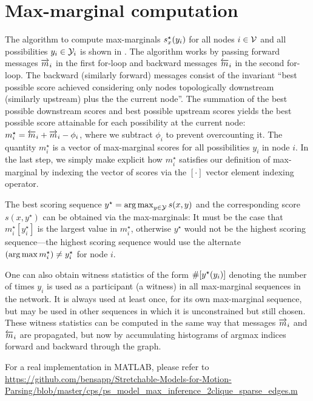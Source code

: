 \chapter{Max-marginal computation}\label{sec:mm-inference}

The algorithm to compute max-marginals $s^\star_x(y_i)$ for all nodes $i \in \mathcal{V}$ and all 
possibilities $y_i \in \mathcal{Y}_i$ is shown in .  The algorithm 
works by passing forward messages $\overrightarrow{m}_i$ in the first for-loop and 
backward messages $\overleftarrow{m}_i$ in the second for-loop.  The backward (similarly 
forward) messages consist of the invariant ``best possible score achieved 
considering only nodes topologically downstream (similarly upstream) plus the
the current node''.  The summation of the best possible downstream scores and 
best possible upstream scores yields the best possible score attainable for 
each possibility at the current node: $m^\star_i = \overleftarrow{m}_i + \overrightarrow{m}_i - 
\phi_i$, where we subtract $\phi_i$ to prevent overcounting it.  The quantity 
$m^\star_i$ is a vector of max-marginal scores for all possibilities $y_i$ in 
node $i$.  In the last step, we simply make explicit how $m^\star_i$ satisfies 
our definition of max-marginal by indexing the vector of scores via the 
$[\cdot]$ vector element indexing operator.

The best scoring sequence $y^\star = \mathop{\arg\max}_{y \in \mathcal{Y}} s(x,y)$ and the 
corresponding score $s(x,y^\star)$ can be obtained via the max-marginals:  It 
must be the case that $m_i^\star[y^\star_i]$ is the largest value in 
$m_i^\star$, otherwise $y^\star$ would not be the highest scoring 
sequence---the highest scoring sequence would use the alternate $(\mathop{\arg\max} 
m_i^\star) \neq y_i^\star$ for node $i$.

One can also obtain witness statistics of the form $\#[y^\star(y_i)]$ denoting the 
number of times $y_i$ is used as a participant (a witness) in all max-marginal 
sequences in the network.  It is always used at least once, for its own 
max-marginal sequence, but may be used in other sequences in which it is 
unconstrained but still chosen.  These witness statistics can be computed in 
the same way that messages $\overrightarrow{m}_i$ and $\overleftarrow{m}_i$ are propagated, but now 
by accumulating histograms of argmax indices forward and backward through the 
graph.


For a real implementation in MATLAB, please refer to \\
\footnotesize{
\url{https://github.com/bensapp/Stretchable-Models-for-Motion-Parsing/blob/master/cps/ps_model_max_inference_2clique_sparse_edges.m}
}

